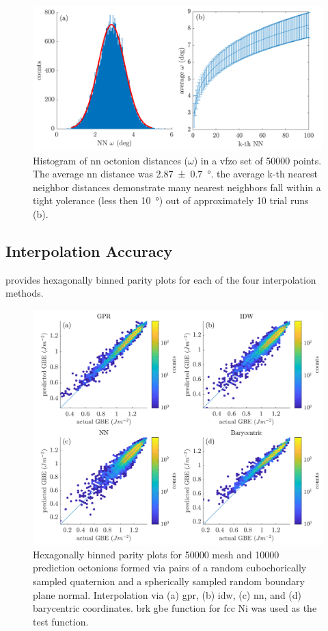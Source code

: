 \documentclass[final,twocolumn,12pt]{elsarticle}
\newcommand{\outpt}{prediction}
\begin{document}
\begin{figure}
\centering
\includegraphics[scale=1]{nnhist-knn-50000.png}
\caption{Histogram of \gls{nn} octonion distances ($\omega$) in a \gls{vfzo} set of \num{50000} points. The average \gls{nn} distance was \SI{2.87 \pm 0.7}{\degree}. the average k-th nearest neighbor distances demonstrate many nearest neighbors fall within a tight yolerance (less then \SI{10}{\degree}) out of approximately 10 trial runs (b).}
\label{fig:nnhist-knn-50000}
\end{figure}

\subsection{Interpolation Accuracy}
\label{sec:results:accuracy}

 provides hexagonally binned parity plots \cite{beanHexscatter2020} for each of the four interpolation methods.
\begin{figure}
    \centering
    \includegraphics[scale=1]{brkparity50000.png}
    \caption{Hexagonally binned parity plots for \num{50000} mesh and \num{10000} \outpt{} octonions formed via pairs of a random cubochorically sampled quaternion and a spherically sampled random boundary plane normal. Interpolation via (a) \gls{gpr}, (b) \gls{idw}, (c) \gls{nn}, and (d) barycentric coordinates.  \gls{brk} \gls{gbe} function for \gls{fcc} Ni was used as the test function.}
    \label{fig:brkparity50000}
\end{figure}
\end{document}
